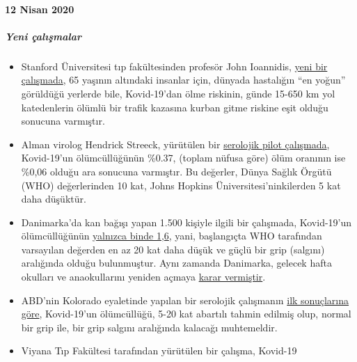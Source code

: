\hypertarget{12-nisan-2020}{%
\paragraph{12 Nisan 2020}\label{12-nisan-2020}}

\hypertarget{yeni-uxe7alux131ux15fmalar}{%
\subparagraph{\texorpdfstring{\textbf{Yeni
çalışmalar}}{Yeni çalışmalar}}\label{yeni-uxe7alux131ux15fmalar}}

\begin{itemize}
\tightlist
\item
  Stanford Üniversitesi tıp fakültesinden profesör John Ioannidis,
  \href{https://www.medrxiv.org/content/10.1101/2020.04.05.20054361v1}{yeni
  bir çalışmada}, 65 yaşının altındaki insanlar için, dünyada hastalığın
  ``en yoğun'' görüldüğü yerlerde bile, Kovid-19'dan ölme riskinin,
  günde 15-650 km yol katedenlerin ölümlü bir trafik kazasına kurban
  gitme riskine eşit olduğu sonucuna varmıştır.
\item
  Alman virolog Hendrick Streeck, yürütülen bir
  \href{https://www.land.nrw/sites/default/files/asset/document/zwischenergebnis_covid19_case_study_gangelt_0.pdf}{serolojik
  pilot çalışmada}, Kovid-19'un ölümcüllüğünün \%0.37, (toplam nüfusa
  göre) ölüm oranının ise \%0,06 olduğu ara sonucuna varmıştır. Bu
  değerler, Dünya Sağlık Örgütü (WHO) değerlerinden 10 kat, Johns
  Hopkins Üniversitesi'ninkilerden 5 kat daha düşüktür.
\item
  Danimarka'da kan bağışı yapan 1.500 kişiyle ilgili bir çalışmada,
  Kovid-19'un ölümcüllüğünün
  \href{https://www.dr.dk/nyheder/indland/doedelighed-skal-formentlig-taelles-i-promiller-danske-blodproever-kaster-nyt-lys}{yalnızca
  binde 1,6}, yani, başlangıçta WHO tarafından varsayılan değerden en az
  20 kat daha düşük ve güçlü bir grip (salgını) aralığında olduğu
  bulunmuştur. Aynı zamanda Danimarka, gelecek hafta okulları ve
  anaokullarını yeniden açmaya
  \href{https://www.thelocal.dk/20200406/denmark-to-reopen-schools-and-kindergartens-next-week}{karar
  vermiştir}.
\item
  ABD'nin Kolorado eyaletinde yapılan bir serolojik çalışmanın
  \href{https://reason.com/2020/04/08/mass-antibody-testing-in-this-rural-colorado-county-sheds-light-on-covid-19s-prevalence-and-lethality/}{ilk
  sonuçlarına göre}, Kovid-19'un ölümcüllüğü, 5-20 kat abartılı tahmin
  edilmiş olup, normal bir grip ile, bir grip salgını aralığında
  kalacağı muhtemeldir.
\item
  Viyana Tıp Fakültesi tarafından yürütülen bir çalışma, Kovid-19

\end{itemize}

